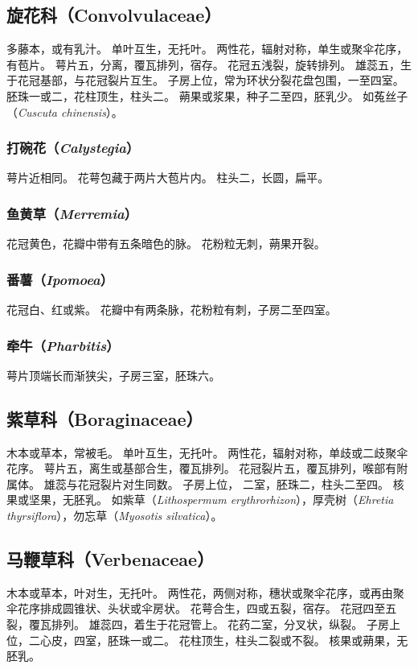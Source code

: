 \documentclass[11pt]{article}
\begin{document}
\begin{sloppypar}
\subsection{旋花科（Convolvulaceae）}
多藤本，或有乳汁。
单叶互生，无托叶。
两性花，辐射对称，单生或聚伞花序，有苞片。
萼片五，分离，覆瓦排列，宿存。
花冠五浅裂，旋转排列。
雄蕊五，生于花冠基部，与花冠裂片互生。
子房上位，常为环状分裂花盘包围，一至四室。
胚珠一或二，花柱顶生，柱头二。
蒴果或浆果，种子二至四，胚乳少。
如菟丝子（\textit{Cuscuta chinensis}）。

\subsubsection{打碗花（\textit{Calystegia}）}
萼片近相同。
花萼包藏于两片大苞片内。
柱头二，长圆，扁平。

\subsubsection{鱼黄草（\textit{Merremia}）}
花冠黄色，花瓣中带有五条暗色的脉。
花粉粒无刺，蒴果开裂。

\subsubsection{番薯（\textit{Ipomoea}）}
花冠白、红或紫。
花瓣中有两条脉，花粉粒有刺，子房二至四室。

\subsubsection{牵牛（\textit{Pharbitis}）}
萼片顶端长而渐狭尖，子房三室，胚珠六。

\subsection{紫草科（Boraginaceae）}
木本或草本，常被毛。
单叶互生，无托叶。
两性花，辐射对称，单歧或二歧聚伞花序。
萼片五，离生或基部合生，覆瓦排列。
花冠裂片五，覆瓦排列，喉部有附属体。
雄蕊与花冠裂片对生同数。
子房上位， 二室，胚珠二，柱头二至四。
核果或坚果，无胚乳。
如紫草（\textit{Lithospermum erythrorhizon}），厚壳树（\textit{Ehretia thyrsiflora}），勿忘草（\textit{Myosotis silvatica}）。

\subsection{马鞭草科（Verbenaceae）}
木本或草本，叶对生，无托叶。
两性花，两侧对称，穗状或聚伞花序，或再由聚伞花序排成圆锥状、头状或伞房状。
花萼合生，四或五裂，宿存。
花冠四至五裂，覆瓦排列。
雄蕊四，着生于花冠管上。
花药二室，分叉状，纵裂。
子房上位，二心皮，四室，胚珠一或二。
花柱顶生，柱头二裂或不裂。
核果或蒴果，无胚乳。


\end{sloppypar}
\end{document}
